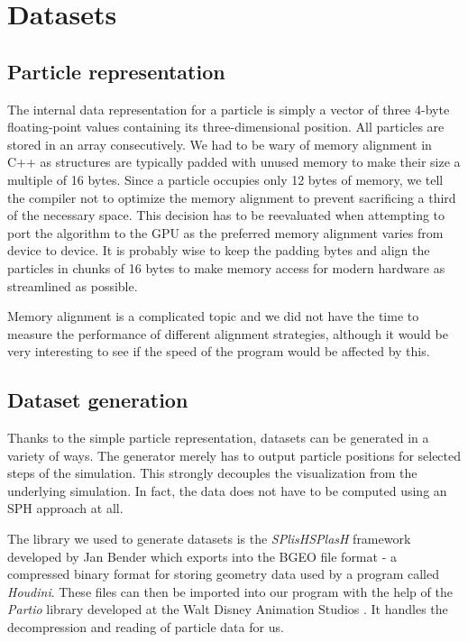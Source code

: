 \section{Datasets}
\label{sec:datasets}

\subsection{Particle representation}

The internal data representation for a particle is simply a vector of three 4-byte floating-point values containing its three-dimensional position. All particles are stored in an array consecutively. We had to be wary of memory alignment in C++ as structures are typically padded with unused memory to make their size a multiple of 16 bytes. Since a particle occupies only 12 bytes of memory, we tell the compiler not to optimize the memory alignment to prevent sacrificing a third of the necessary space. This decision has to be reevaluated when attempting to port the algorithm to the GPU as the preferred memory alignment varies from device to device. It is probably wise to keep the padding bytes and align the particles in chunks of 16 bytes to make memory access for modern hardware as streamlined as possible.

Memory alignment is a complicated topic and we did not have the time to measure the performance of different alignment strategies, although it would be very interesting to see if the speed of the program would be affected by this.

\subsection{Dataset generation}

Thanks to the simple particle representation, datasets can be generated in a variety of ways. The generator merely has to output particle positions for selected steps of the simulation. This strongly decouples the visualization from the underlying simulation. In fact, the data does not have to be computed using an SPH approach at all.

The library we used to generate datasets is the \textit{SPlisHSPlasH} framework developed by Jan Bender \cite{SplishSplash} which exports into the BGEO file format - a compressed binary format for storing geometry data used by a program called \textit{Houdini}. These files can then be imported into our program with the help of the \textit{Partio} library developed at the Walt Disney Animation Studios \cite{Partio}. It handles the decompression and reading of particle data for us.

